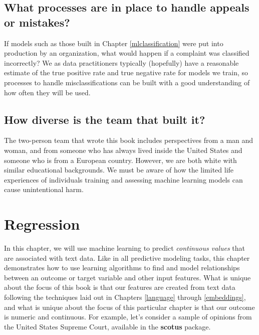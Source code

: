 \documentclass[
]{krantz}
\begin{document}
\hypertarget{what-processes-are-in-place-to-handle-appeals-or-mistakes}{%
\section*{What processes are in place to handle appeals or mistakes?}\label{what-processes-are-in-place-to-handle-appeals-or-mistakes}}


If models such as those built in Chapter \ref{mlclassification} were put into production by an organization, what would happen if a complaint was classified incorrectly? We as data practitioners typically (hopefully) have a reasonable estimate of the true positive rate and true negative rate for models we train, so processes to handle misclassifications can be built with a good understanding of how often they will be used.

\hypertarget{how-diverse-is-the-team-that-built-it}{%
\section*{How diverse is the team that built it?}\label{how-diverse-is-the-team-that-built-it}}


\thispagestyle{myheadings}

The two-person team that wrote this book includes perspectives from a man and woman, and from someone who has always lived inside the United States and someone who is from a European country. However, we are both white with similar educational backgrounds. We must be aware of how the limited life experiences of individuals training and assessing machine learning models can cause unintentional harm.

\hypertarget{mlregression}{%
\chapter{Regression}\label{mlregression}}

In this chapter, we will use machine learning to predict \emph{continuous values} that are associated with text data. Like in all predictive modeling tasks, this chapter demonstrates how to use learning algorithms to find and model relationships between an outcome or target variable and other input features. What is unique about the focus of this book is that our features are created from text data following the techniques laid out in Chapters \ref{language} through \ref{embeddings}, and what is unique about the focus of this particular chapter is that our outcome is numeric and continuous. For example, let's consider a sample of opinions from the United States Supreme Court, available in the \textbf{scotus} \citep{R-scotus} package.
\end{document}
